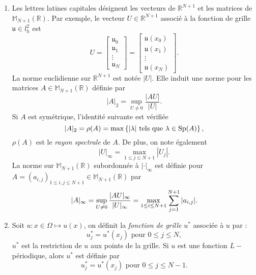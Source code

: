 \begin{enumerate}
\item Les lettres latines capitales désignent les vecteurs de $\mathbb{R}^{N+1}$ et les matrices de $\mathbb{M}_{N+1}(\mathbb{R})$. Par exemple, le vecteur $U \in \mathbb{R}^{N+1}$ associé à la fonction de grille $\mathfrak{u} \in l^2_h$ est
\begin{equation}
U = \begin{bmatrix}
\mathfrak{u}_0 \\ \mathfrak{u}_1 \\ \vdots \\ \mathfrak{u}_N
\end{bmatrix} =
\begin{bmatrix}
\mathfrak{u}(x_0) \\ \mathfrak{u}(x_1) \\ \vdots \\ \mathfrak{u}(x_N)
\end{bmatrix}.
\end{equation}
La norme euclidienne sur $\mathbb{R}^{N+1}$ est notée $|U|$. Elle induit une norme pour les matrices $A \in \mathbb{M}_{N+1}(\mathbb{R})$ définie par
\begin{equation}
|A|_2 = \sup_{U \neq 0} \dfrac{|AU|}{|U|}.
\end{equation}
Si $A$ est symétrique, l'identité suivante est vérifiée
\begin{equation}
|A|_2 = \rho(A) = \max \left\lbrace |\lambda| \text{ tels que } \lambda \in \text{Sp} (A) \right\rbrace,
\end{equation}
$\rho(A)$ est le \textit{rayon spectrale} de $A$.
De plus, on note également
\begin{equation}
|U|_{\infty} = \max_{1 \leq j \leq N+1} |U_j|.
\end{equation}
La norme sur $\mathbb{M}_{N+1}(\mathbb{R})$ subordonnée à $|\cdot|_{\infty}$ est définie pour $A=(a_{i,j})_{1 \leq i,j \leq N+1} \in \mathbb{M}_{N+1}(\mathbb{R})$ par
\begin{equation}
|A|_{\infty} = \sup_{U \neq 0} \dfrac{|AU|_{\infty}}{|U|_{\infty}} = \max_{1 \leq i \leq N+1} \displaystyle\sum\limits_{j=1}^{N+1} |a_{i,j}|.
\end{equation}



\item Soit $u: x \in \Omega \mapsto u(x)$, on définit la \textit{fonction de grille} $u^*$ associée à $u$ par :
\begin{equation}
u^*_j = u^*(x_j) \text{ pour } 0 \leq j \leq N,
\end{equation}
$u^*$ est la restriction de $u$ aux points de la grille. Si $u$ est une fonction $L-$périodique, alors $u^*$ est définie par
\begin{equation}
u^*_j = u^*(x_j) \text{ pour } 0 \leq j \leq N-1.
\end{equation}
\end{enumerate}

